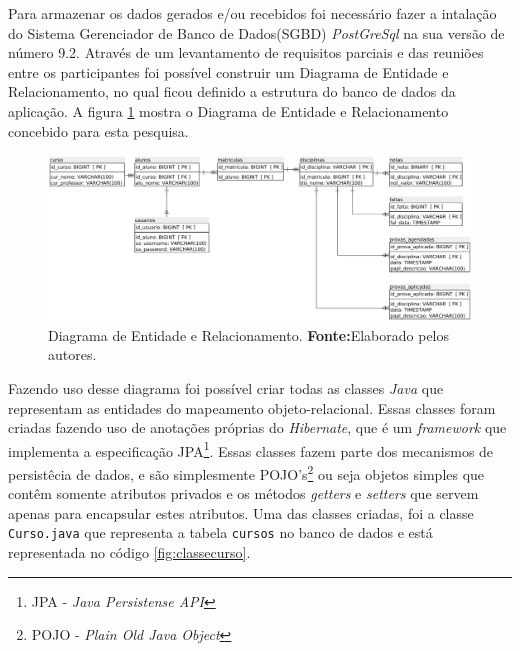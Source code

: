 		\par Para armazenar os dados gerados e/ou recebidos foi necessário fazer a
	intalação do Sistema Gerenciador de Banco de Dados(SGBD) \textit{PostGreSql} na
	sua versão de número 9.2. Através de um levantamento de requisitos parciais e das
	reuniões entre os participantes foi possível construir um Diagrama de Entidade
	e Relacionamento, no qual ficou definido a estrutura do banco de dados da
	aplicação. A figura \ref{fig:exemplo5} mostra o Diagrama de Entidade e
	Relacionamento concebido para esta pesquisa.

		\begin{figure}[h!]
			\centerline{\includegraphics[scale=0.5]{./imagens/imagem5.png}}
			\caption[Diagrama de Entidade e Relacionamento]{Diagrama de Entidade e
			Relacionamento.
			\textbf{Fonte:}Elaborado pelos autores.}
			\label{fig:exemplo5}
		\end{figure}

		\par Fazendo uso desse diagrama foi possível criar todas as classes
	\textit{Java} que representam as entidades do mapeamento objeto-relacional. 
	Essas classes foram criadas fazendo uso de anotações próprias do
	\textit{Hibernate}, que é um \textit{framework} que implementa a especificação
	JPA\footnote{JPA - \textit{Java Persistense API}}. Essas classes fazem parte
	dos mecanismos de persistêcia de dados, e são simplesmente POJO's\footnote{POJO
	- \textit{Plain Old Java Object }} ou seja objetos simples que contêm somente
	atributos privados e os métodos \textit{getters} e \textit{setters} que servem
	apenas para encapsular estes atributos. Uma das classes criadas, foi a classe
	\texttt{Curso.java} que representa a tabela \texttt{cursos} no banco de dados e
	está representada no código \ref{fig:classecurso}.
	
	\pagebreak
	
